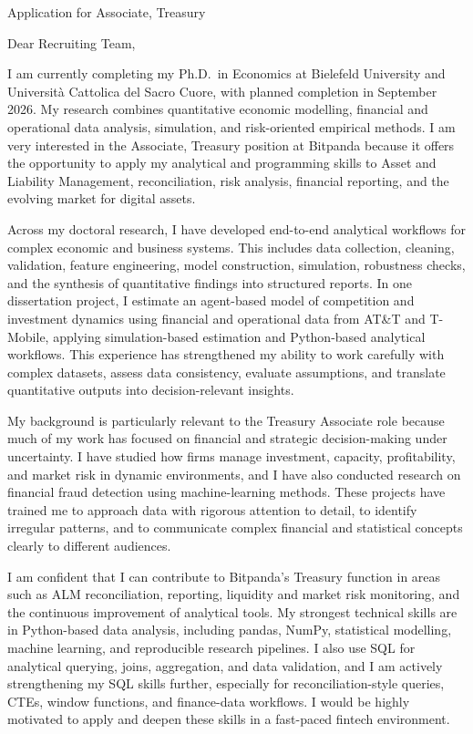 \documentclass[11pt]{article}
\begin{document}
\vspace{0.1cm}

\noindent
Application for Associate, Treasury \\

\vspace{0.05cm}

\noindent Dear Recruiting Team,

I am currently completing my Ph.D.\ in Economics at Bielefeld University and Universit\`a Cattolica del Sacro Cuore, with planned completion in September 2026. My research combines quantitative economic modelling, financial and operational data analysis, simulation, and risk-oriented empirical methods. I am very interested in the Associate, Treasury position at Bitpanda because it offers the opportunity to apply my analytical and programming skills to Asset and Liability Management, reconciliation, risk analysis, financial reporting, and the evolving market for digital assets.

Across my doctoral research, I have developed end-to-end analytical workflows for complex economic and business systems. This includes data collection, cleaning, validation, feature engineering, model construction, simulation, robustness checks, and the synthesis of quantitative findings into structured reports. In one dissertation project, I estimate an agent-based model of competition and investment dynamics using financial and operational data from AT\&T and T-Mobile, applying simulation-based estimation and Python-based analytical workflows. This experience has strengthened my ability to work carefully with complex datasets, assess data consistency, evaluate assumptions, and translate quantitative outputs into decision-relevant insights.

My background is particularly relevant to the Treasury Associate role because much of my work has focused on financial and strategic decision-making under uncertainty. I have studied how firms manage investment, capacity, profitability, and market risk in dynamic environments, and I have also conducted research on financial fraud detection using machine-learning methods. These projects have trained me to approach data with rigorous attention to detail, to identify irregular patterns, and to communicate complex financial and statistical concepts clearly to different audiences.

I am confident that I can contribute to Bitpanda's Treasury function in areas such as ALM reconciliation, reporting, liquidity and market risk monitoring, and the continuous improvement of analytical tools. My strongest technical skills are in Python-based data analysis, including pandas, NumPy, statistical modelling, machine learning, and reproducible research pipelines. I also use SQL for analytical querying, joins, aggregation, and data validation, and I am actively strengthening my SQL skills further, especially for reconciliation-style queries, CTEs, window functions, and finance-data workflows. I would be highly motivated to apply and deepen these skills in a fast-paced fintech environment.
\end{document}
